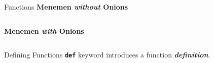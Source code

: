         \begin{frame}[c]{Functions}
            \large
            \textbf{Menemen \textit{without} Onions}
            \normalsize
            \inputminted[firstline=1, lastline=4, frame=single,framesep=2pt]{python3}{code-examples/menemen.py}
            \pause
            \large
            \textbf{Menemen \textit{with} Onions}
            \normalsize
            \inputminted[firstline=6, lastline=11, frame=single,framesep=2pt]{python3}{code-examples/menemen.py}
            \pause
            \begin{center}
            \end{center}
        \end{frame}

        \begin{frame}{Defining Functions}
            \LARGE
            \textbf{\texttt{def}} keyword introduces a function \textbf{\textit{definition}}.
            \\
            \large
            \inputminted[firstline=14, lastline=16, frame=single,framesep=2pt]{python3}{code-examples/menemen.py}
            \inputminted[firstline=18, lastline=20, frame=single,framesep=2pt]{python3}{code-examples/menemen.py}
        \end{frame}

